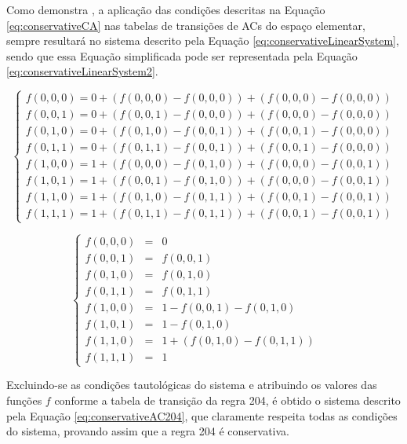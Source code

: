 \documentclass[12pt,a4paper]{article}
\begin{document}
	Como demonstra \cite{Verardo2014}, a aplicação das condições descritas na Equação \ref{eq:conservativeCA} nas tabelas de transições de ACs do espaço elementar, sempre resultará no sistema descrito pela Equação \ref{eq:conservativeLinearSystem}, sendo que essa Equação simplificada pode ser representada pela Equação \ref{eq:conservativeLinearSystem2}.

	\begin{equation}
	\left\{\begin{matrix}
	 f(0,0,0) = 0 + (f(0,0,0) - f(0,0,0)) + (f(0,0,0) - f(0,0,0))\\ 
	 f(0,0,1) = 0 + (f(0,0,1) - f(0,0,0)) + (f(0,0,0) - f(0,0,0))\\ 
	 f(0,1,0) = 0 + (f(0,1,0) - f(0,0,1)) + (f(0,0,1) - f(0,0,0))\\ 
	 f(0,1,1) = 0 + (f(0,1,1) - f(0,0,1)) + (f(0,0,1) - f(0,0,0))\\ 
	 f(1,0,0) = 1 + (f(0,0,0) - f(0,1,0)) + (f(0,0,0) - f(0,0,1))\\ 
	 f(1,0,1) = 1 + (f(0,0,1) - f(0,1,0)) + (f(0,0,0) - f(0,0,1))\\ 
	 f(1,1,0) = 1 + (f(0,1,0) - f(0,1,1)) + (f(0,0,1) - f(0,0,1))\\ 
	 f(1,1,1) = 1 + (f(0,1,1) - f(0,1,1)) + (f(0,0,1) - f(0,0,1))
	\end{matrix}\right.
	\label{eq:conservativeLinearSystem}
	\end{equation}

	\begin{equation}
	\left\{\begin{matrix}
	 f(0,0,0) & = & 0 		& &\\ 
	 f(0,0,1) & = & f(0,0,1)& & \\ 
	 f(0,1,0) & = & f(0,1,0)& & \\ 
	 f(0,1,1) & = & f(0,1,1)& & \\ 
	 f(1,0,0) & = & 1 - f(0,0,1) - f(0,1,0) \\ 
	 f(1,0,1) & = & 1 - f(0,1,0) \\ 
	 f(1,1,0) & = & 1 + (f(0,1,0) - f(0,1,1))\\ 
	 f(1,1,1) & = & 1 & &
	\end{matrix}\right.
	\label{eq:conservativeLinearSystem2}
	\end{equation}

	Excluindo-se as condições tautológicas do sistema e atribuindo os valores das funções $f$ conforme a tabela de transição da regra 204, é obtido o sistema descrito pela Equação \ref{eq:conservativeAC204}, que claramente respeita todas as condições do sistema, provando assim que a regra 204 é conservativa.
\end{document}
